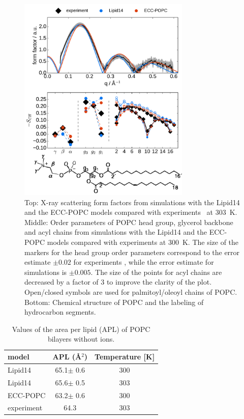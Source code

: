 \documentclass[aip,jcp,twocolumn]{revtex4}
\begin{document}
\begin{figure}[tb!]
  \centering
  \includegraphics[width=8.2cm]{../Fig/ipython_nb/Order-parameters_form-factors_exp-L14-ECCL17_q80_sig89_POPC-struct.pdf}
  \caption{\label{simVSexpNOions}
    Top: X-ray scattering form factors from simulations with the Lipid14 \cite{dickson14} and
    the ECC-POPC models compared with experiments~\cite{kucerka11} at 303~K. \\
    Middle: Order parameters of POPC head group, glycerol backbone and acyl chains 
    from simulations with the Lipid14 \cite{dickson14} and the ECC-POPC models
    compared with experiments \cite{ferreira13} at 300~K.
    The size of the markers for the head group order parameters correspond to
    the error estimate $\pm 0.02$ for experiments \cite{botan15,ollila16},
    while the error estimate for simulations is $\pm 0.005$.
    The size of the points for acyl chains are decreased by a factor of 3 to improve the clarity of the plot.
    Open/closed symbols are used for palmitoyl/oleoyl chains of POPC. \\
    Bottom: Chemical structure of POPC and the labeling of hydrocarbon segments.
  } 
\end{figure}

\begin{table}[tb!]
  \caption{Values of the area per lipid (APL) of POPC bilayers without ions. \label{tab:apls}
  }
  \begin{tabular}{l|c c}
    model          & APL (\AA$^2$)   & Temperature [K] \\
    \hline
    Lipid14                   & 65.1$\pm$ 0.6  &  300 \\
    Lipid14 \cite{dickson14}  & 65.6$\pm$ 0.5  &  303 \\
    \hline
    ECC-POPC                & 63.2$\pm$ 0.6  &  300       \\
    \hline
    experiment \cite{kucerka11} & 64.3  &  303    \\
    \hline
  \end{tabular}
\end{table}
\end{document}
